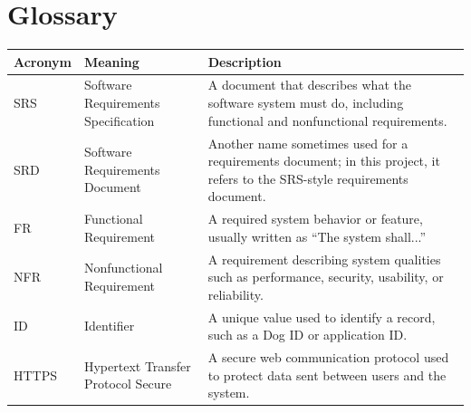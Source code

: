 \documentclass[12pt]{article}
\begin{document}
\section*{Glossary}
\begin{tabular}{|l|l|p{8cm}|}
\hline
\textbf{Acronym} & \textbf{Meaning} & \textbf{Description} \\
\hline
SRS & Software Requirements Specification & A document that describes what the software system must do, including functional and nonfunctional requirements. \\
\hline
SRD & Software Requirements Document & Another name sometimes used for a requirements document; in this project, it refers to the SRS-style requirements document. \\
\hline
FR & Functional Requirement & A required system behavior or feature, usually written as ``The system shall...'' \\
\hline
NFR & Nonfunctional Requirement & A requirement describing system qualities such as performance, security, usability, or reliability. \\
\hline
ID & Identifier & A unique value used to identify a record, such as a Dog ID or application ID. \\
\hline
HTTPS & Hypertext Transfer Protocol Secure & A secure web communication protocol used to protect data sent between users and the system. \\
\hline
\end{tabular}
\end{document}
